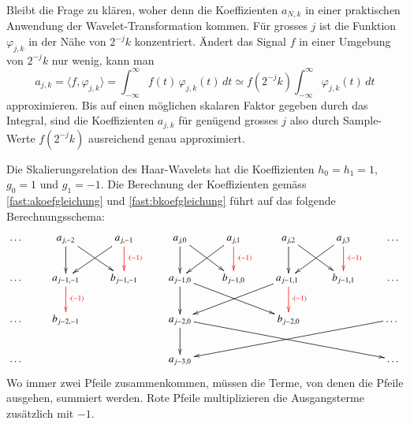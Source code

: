 Bleibt die Frage zu klären, woher denn die Koeffizienten $a_{N,k}$ in einer
praktischen Anwendung der Wavelet-Transformation kommen.
Für grosses $j$ ist die Funktion $\varphi_{j,k}$ in der Nähe von $2^{-j}k$
konzentriert.
Ändert das Signal $f$ in einer Umgebung von $2^{-j}k$ nur wenig, kann man
\begin{equation*}
a_{j,k}
=
\langle f,\varphi_{j,k}\rangle
=
\int_{-\infty}^\infty f(t)\, \varphi_{j,k}(t)\,dt
\simeq
f(2^{-j}k)
\int_{-\infty}^\infty \varphi_{j,k}(t)\,dt
\end{equation*}
approximieren.
Bis auf einen möglichen skalaren Faktor gegeben durch das Integral, sind
die Koeffizienten $a_{j,k}$ für genügend grosses $j$ also durch
Sample-Werte $f(2^{-j}k)$ ausreichend genau approximiert.

\begin{beispiel}
Die Skalierungsrelation des Haar-Wavelets hat die Koeffizienten
$h_0=h_1=1$, $g_0=1$ und $g_1=-1$.
Die Berechnung der Koeffizienten gemäss \eqref{fast:akoefgleichung}
und \eqref{fast:bkoefgleichung} führt auf das folgende Berechnungsschema:
\[
\xymatrix{
\dots
	&a_{j,-2} \ar[d] \ar[dr]
		&a_{j,-1} \ar@[red][d]^{\color{red}\cdot (-1)} \ar[dl]
			&a_{j,0} \ar[d] \ar[dr]
				&a_{j,1} \ar@[red][d]^{\color{red}\cdot (-1)} \ar[dl]
					&a_{j,2} \ar[d] \ar[dr]
						&a_{j,3} \ar@[red][d]^{\color{red}\cdot (-1)} \ar[dl]
							&\dots
\\
\dots
	&a_{j-1,-1} \ar@[red][d]^{\color{red}\cdot(-1)}
		&b_{j-1,-1}
			&a_{j-1,0}\ar[d] \ar[drr]
				&b_{j-1,0}
					&a_{j-1,1} \ar@[red][d]^{\color{red}\cdot (-1)} \ar[dll]
						&b_{j-1,1}
							&\dots
\\
\dots &b_{j-2,-1} 
		&
			&a_{j-2,0} \ar[d] \ar[drrrr]
				&
					&b_{j-2,0}
						&
							&\dots \ar[dllll]
\\
\dots &
		&
			&a_{j-3,0}
				&
					&
						&
							&\dots
}
\]
Wo immer zwei Pfeile zusammenkommen, müssen die Terme, von denen die
Pfeile ausgehen, summiert werden.
Rote Pfeile multiplizieren die Ausgangsterme zusätzlich mit $-1$.
\end{beispiel}




